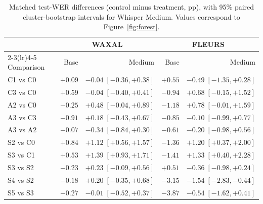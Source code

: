 \documentclass[12pt,a4paper]{report}
\begin{document}
\begin{table}[htbp]\centering\scriptsize
\caption{Matched test-WER differences (control minus treatment, pp), with 95\%
paired cluster-bootstrap intervals for Whisper Medium. Values correspond to
Figure~\ref{fig:forest}.}
\label{tab:effects}
\begin{tabular}{lrrrr}\toprule
 & \multicolumn{2}{c}{WAXAL} & \multicolumn{2}{c}{FLEURS}\\
\cmidrule(lr){2-3}\cmidrule(lr){4-5}
Comparison & Base & Medium & Base & Medium\\\midrule
C1 vs C0 & $+0.09$ & $-0.04\;[-0.36, +0.38]$ & $+0.55$ & $-0.49\;[-1.35, +0.28]$ \\
C3 vs C0 & $+0.59$ & $-0.04\;[-0.40, +0.41]$ & $-0.94$ & $+0.68\;[-0.15, +1.52]$ \\
A2 vs C0 & $-0.25$ & $+0.48\;[-0.04, +0.89]$ & $-1.18$ & $+0.78\;[-0.01, +1.59]$ \\
A3 vs C3 & $-0.91$ & $+0.18\;[-0.43, +0.67]$ & $-0.85$ & $-0.10\;[-0.99, +0.77]$ \\
A3 vs A2 & $-0.07$ & $-0.34\;[-0.84, +0.30]$ & $-0.61$ & $-0.20\;[-0.98, +0.56]$ \\
S2 vs C0 & $+0.84$ & $+1.12\;[+0.56, +1.57]$ & $-1.36$ & $+1.20\;[+0.37, +2.00]$ \\
S3 vs C1 & $+0.53$ & $+1.39\;[+0.93, +1.71]$ & $-1.41$ & $+1.33\;[+0.40, +2.28]$ \\
S3 vs S2 & $-0.23$ & $+0.23\;[-0.09, +0.56]$ & $+0.51$ & $-0.36\;[-0.98, +0.24]$ \\
S4 vs S2 & $-0.18$ & $+0.20\;[-0.35, +0.68]$ & $-3.15$ & $-1.54\;[-2.83, -0.44]$ \\
S5 vs S3 & $-0.27$ & $-0.01\;[-0.52, +0.37]$ & $-3.87$ & $-0.54\;[-1.62, +0.41]$ \\
\bottomrule\end{tabular}
\end{table}
\end{document}
